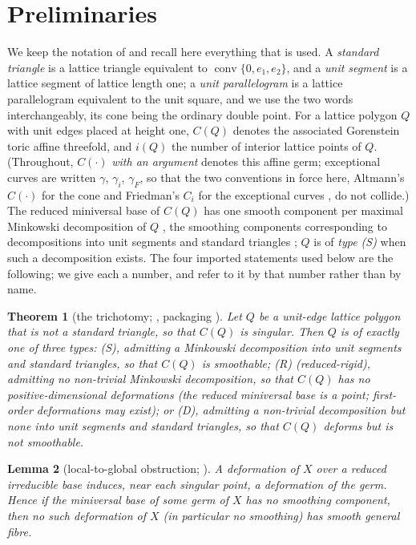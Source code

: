 \documentclass[11pt]{amsart}
\newtheorem{theorem}{Theorem}[section]
\newtheorem{lemma}[theorem]{Lemma}
\theoremstyle{definition}
\theoremstyle{remark}
\newcommand{\conv}{\operatorname{conv}}
\begin{document}
\section{Preliminaries}\label{sec:prelim}

We keep the notation of \cite{paper1} and recall here everything that is
used.  A \emph{standard triangle} is a lattice triangle equivalent to
$\conv\{0,e_1,e_2\}$, and a \emph{unit segment} is a lattice segment of
lattice length one; a \emph{unit parallelogram} is a lattice
parallelogram equivalent to the unit square, and we use the two words
interchangeably, its cone being the ordinary double point.  For a lattice
polygon $Q$ with unit
edges placed at height one, $C(Q)$ denotes the associated Gorenstein
toric affine threefold, and $i(Q)$ the number of interior lattice
points of $Q$.  (Throughout, $C(\cdot)$ \emph{with an argument} denotes
this affine germ; exceptional curves are written $\gamma$, $\gamma_i$,
$\gamma_F$, so that the two conventions in force here, Altmann's
$C(\cdot)$ for the cone and Friedman's $C_i$ for the exceptional curves
\cite{Friedman86,BK10}, do not collide.)  The reduced miniversal base
of $C(Q)$ has one smooth
component per maximal Minkowski decomposition of $Q$
\cite{Altmann97}, the smoothing components corresponding to
decompositions into unit segments and standard triangles \cite{CFP};
$Q$ is of \emph{type (S)} when such a decomposition exists.  The four
imported statements used below are the following; we give each a number,
and refer to it by that number rather than by name.

\begin{theorem}[the trichotomy; {\cite[Thm.~2.2]{paper1}}, packaging
\cite{Altmann97,CFP}]\label{thm:trich}
Let $Q$ be a unit-edge lattice polygon that is not a standard triangle, so
that $C(Q)$ is singular.  Then $Q$ is of exactly one of three types:
\textup{(S)}, admitting a Minkowski decomposition into unit segments and
standard triangles, so that $C(Q)$ is smoothable; \textup{(R)}
\emph{(reduced-rigid)}, admitting no non-trivial Minkowski decomposition, so that
$C(Q)$ has no positive-dimensional deformations (the reduced miniversal
base is a point; first-order deformations may exist); or \textup{(D)}, admitting a
non-trivial decomposition but none into unit segments and standard
triangles, so that $C(Q)$ deforms but is not smoothable.
\end{theorem}

\begin{lemma}[local-to-global obstruction;
{\cite[Lemma~4.1]{paper1}}]\label{lem:ltg}
A deformation of $X$ over a reduced irreducible base induces, near each
singular point, a deformation of the germ.  Hence if the miniversal base
of some germ of $X$ has no smoothing component, then no such deformation
of $X$ (in particular no smoothing) has smooth general fibre.
\end{lemma}
\end{document}
